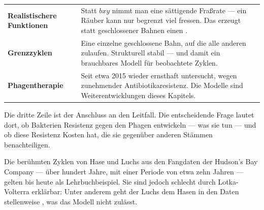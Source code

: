 \begin{forschung}
\begin{center}
{\small
\renewcommand{\arraystretch}{1.45}
\begin{tabular}{@{}P{2.8cm}P{5.4cm}@{}}
\toprule
\textbf{Realistischere Funktionen} & Statt $bxy$ nimmt man eine sättigende Fraßrate --- ein Räuber kann nur begrenzt viel fressen. Das erzeugt statt geschlossener Bahnen einen .\\
\textbf{Grenzzyklen} & Eine einzelne geschlossene Bahn, auf die alle anderen zulaufen. Strukturell stabil --- und damit ein brauchbares Modell für beobachtete Zyklen.\\
\textbf{Phagentherapie} & Seit etwa 2015 wieder ernsthaft untersucht, wegen zunehmender Antibiotikaresistenz. Die Modelle sind Weiterentwicklungen dieses Kapitels.\\
\bottomrule
\end{tabular}}
\end{center}

Die dritte Zeile ist der Anschluss an den Leitfall. Die entscheidende Frage lautet dort, ob Bakterien Resistenz gegen den Phagen entwickeln --- was sie tun --- und ob diese Resistenz Kosten hat, die sie gegenüber anderen Stämmen benachteiligen.

\begin{center}
\begin{minipage}{0.88\textwidth}
\end{minipage}
\end{center}

Die berühmten Zyklen von Hase und Luchs aus den Fangdaten der Hudson's Bay Company --- über hundert Jahre, mit einer Periode von etwa zehn Jahren --- gelten bis heute als Lehrbuchbeispiel. Sie sind jedoch schlecht durch Lotka-Volterra erklärbar: Unter anderem geht der Luchs dem Hasen in den Daten stellenweise , was das Modell nicht zulässt.

\begin{center}
\begin{minipage}{0.88\textwidth}
\end{minipage}
\end{center}
\end{forschung}

